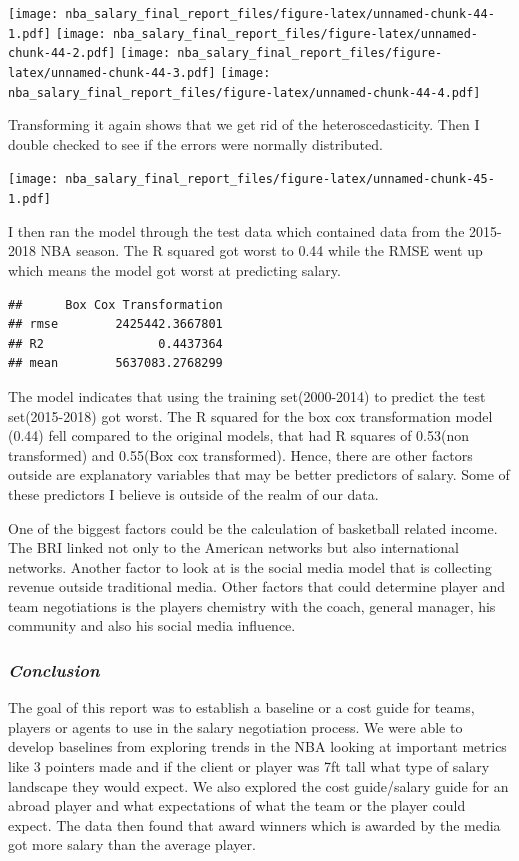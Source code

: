 \documentclass[]{article}
\begin{document}
\texttt{[image: nba\_salary\_final\_report\_files/figure-latex/unnamed-chunk-44-1.pdf]}
\texttt{[image: nba\_salary\_final\_report\_files/figure-latex/unnamed-chunk-44-2.pdf]}
\texttt{[image: nba\_salary\_final\_report\_files/figure-latex/unnamed-chunk-44-3.pdf]}
\texttt{[image: nba\_salary\_final\_report\_files/figure-latex/unnamed-chunk-44-4.pdf]}

Transforming it again shows that we get rid of the heteroscedasticity.
Then I double checked to see if the errors were normally distributed.

\texttt{[image: nba\_salary\_final\_report\_files/figure-latex/unnamed-chunk-45-1.pdf]}

I then ran the model through the test data which contained data from the
2015-2018 NBA season. The R squared got worst to 0.44 while the RMSE
went up which means the model got worst at predicting salary.

\begin{verbatim}
##      Box Cox Transformation
## rmse        2425442.3667801
## R2                0.4437364
## mean        5637083.2768299
\end{verbatim}

The model indicates that using the training set(2000-2014) to predict
the test set(2015-2018) got worst. The R squared for the box cox
transformation model (0.44) fell compared to the original models, that
had R squares of 0.53(non transformed) and 0.55(Box cox transformed).
Hence, there are other factors outside are explanatory variables that
may be better predictors of salary. Some of these predictors I believe
is outside of the realm of our data.

One of the biggest factors could be the calculation of basketball
related income. The BRI linked not only to the American networks but
also international networks. Another factor to look at is the social
media model that is collecting revenue outside traditional media. Other
factors that could determine player and team negotiations is the players
chemistry with the coach, general manager, his community and also his
social media influence.

\subsubsection{\texorpdfstring{\emph{Conclusion}}{Conclusion}}\label{conclusion}

The goal of this report was to establish a baseline or a cost guide for
teams, players or agents to use in the salary negotiation process. We
were able to develop baselines from exploring trends in the NBA looking
at important metrics like 3 pointers made and if the client or player
was 7ft tall what type of salary landscape they would expect. We also
explored the cost guide/salary guide for an abroad player and what
expectations of what the team or the player could expect. The data then
found that award winners which is awarded by the media got more salary
than the average player.
\end{document}
